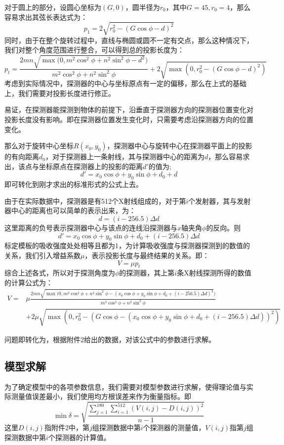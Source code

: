 \documentclass{myart}
\begin{document}
对于圆上的部分，设圆心坐标为\((G,0)\)，圆半径为\(r_0\)，其中\(G = 45,r_0 = 4\)，那么容易求出其弦长表达式为：
\[p_1 = 2\sqrt{r_0^2 - (G\cos\phi - d)^2}\]
同时，由于在整个旋转过程中，直线与椭圆或圆不一定有交点，那么这种情况下，我们对整个角度范围进行整合，可以得到总的投影长度为：
\[p_t =  \frac{2mn\sqrt{\max(0,m^2\cos^2\phi + n^2\sin^2\phi - d^2})}{ m^2\cos^2\phi + n^2\sin^2\phi} + 2\sqrt{\max(0,r_0^2 - (G\cos\phi - d)^2)}\]
考虑到实际情况中，探测器的中心与坐标原点有一定的偏移，那么在上式的基础上，我们需要对投影长度进行修正。

易证，在探测器能探测到物体的前提下，沿垂直于探测器方向的探测器位置变化对投影长度没有影响。即在探测器位置发生变化时，只需要考虑沿探测器方向的位置变化。


那么对于旋转中心坐标\(R(x_0,y_0)\)，探测器中心与旋转中心在探测器平面上的投影的有向距离\(d_0\)，对于探测器上一条射线，其与探测器中心的距离为\(d\)，那么容易求出，该点与坐标原点在探测器上的投影的距离\(d'\)的值为;
\[d' = x_0\cos\phi + y_0\sin\phi + d_0 + d\]
即可转化到刚才求出的标准形式的公式上去。

由于在实际数据中，探测器是有512个X射线组成的，对于第\(i\)个发射器，其与发射器中心的距离也可以简单的表示出来，为：
\[d = (i - 256.5)\Delta d\]
这里距离的负号表示探测器中心与该点的连线沿探测器与\(x\)轴夹角\(\phi\)的反向。则
\[d' = x_0\cos\phi + y_0\sin\phi + d_0 +  (i - 256.5)\Delta d\]
标定模板的吸收强度处处相等且都为1，为计算吸收强度与探测器探测到的数值的关系，我们引入增益系数\(\mu\)，表示投影长度与最终结果的关系。即：
\[V = \mu p_t\]
综合上述各式，所以对于探测角度为\(\phi\)的探测器，其上第\(i\)条X射线探测所得的数值的计算公式为：
\begin{align*}\label{val}
V = & \mu\frac{2mn\sqrt{\max(0,m^2\cos^2\phi + n^2\sin^2\phi - (x_0\cos\phi + y_0\sin\phi + d_0 +  (i - 256.5)\Delta d)^2})}{ m^2\cos^2\phi + n^2\sin^2\phi} \\
  & + 2\mu\sqrt{\max(0,r_0^2 - (G\cos\phi - (x_0\cos\phi + y_0\sin\phi + d_0 +  (i - 256.5)\Delta d))^2)}
\end{align*}

问题即转化为，根据附件2给出的数据，对该公式中的参数进行求解。

\subsection{模型求解}
为了确定模型中的各项参数信息，我们需要对模型参数进行求解，使得理论值与实际测量值误差最小，我们使用均方根误差来作为衡量指标。即
\[\min\delta = \sqrt{\frac{ \sum_{j = 1}^{180}\sum_{i=1}^{512}(V(i,j) - D(i,j))^2}{n-1}}\]
这里\(D(i,j)\)指附件2中，第\(j\)组探测数据中第\(i\)个探测器的测量值，\(V(i,j)\)指第\(j\)组探测数据中第\(i\)个探测器的计算值。
\end{document}
